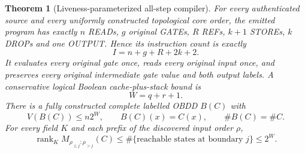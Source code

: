 \documentclass[11pt]{article}
\newtheorem{theorem}{Theorem}
\begin{document}
\begin{theorem}[Liveness-parameterized all-step compiler]
For every authenticated source and every uniformly constructed topological core order, the emitted program has exactly $n$ READs, $g$ original GATEs, $R$ REFs, $k+1$ STOREs, $k$ DROPs and one OUTPUT. Hence its instruction count is exactly
\[
 I=n+g+R+2k+2.
\]
It evaluates every original gate once, reads every original input once, and preserves every original intermediate gate value and both output labels. A conservative logical Boolean cache-plus-stack bound is
\[
 W=q+r+1.
\]
There is a fully constructed complete labelled OBDD $B(C)$ with
\[
 V(B(C))\le n2^W,\qquad B(C)(x)=C(x),\qquad \#B(C)=\#C.
\]
For every field $K$ and each prefix of the discovered input order $\rho$,
\[
 \operatorname{rank}_K M_{\rho_{\le j}:\rho_{>j}}(C)
 \le \#\{\text{reachable states at boundary }j\}\le 2^W.
\]
\end{theorem}
\end{document}
